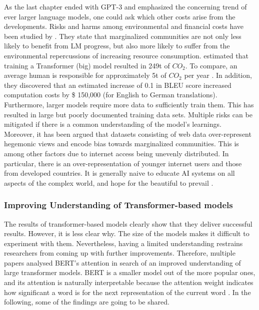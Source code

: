 \documentclass[
]{krantz}
\begin{document}
As the last chapter ended with GPT-3 and emphasized the concerning trend
of ever larger language models, one could ask which other costs arise
from the developments. Risks and harms among environmental and financial
costs have been studied by \citet{Bender2021}. They state that marginalized
communities are not only less likely to benefit from LM progress, but
also more likely to suffer from the environmental repercussions of
increasing resource consumption. \citet{Strubell2019} estimated that training
a Transformer (big) model resulted in 249t of \(CO_2\). To compare, an
average human is responsible for approximately 5t of \(CO_2\) per year
\citep{Ritchie2020}. In addition, they discovered that an
estimated increase of 0.1 in BLEU score increased computation costs by
\$ 150,000 (for English to German translations). Furthermore, larger
models require more data to sufficiently train them. This has resulted
in large but poorly documented training data sets. Multiple risks can be
mitigated if there is a common understanding of the model's learnings.\\

Moreover, it has been argued that datasets consisting of web data
over-represent hegemonic views and encode bias towards marginalized
communities. This is among other factors due to internet access being
unevenly distributed. In particular, there is an over-representation of
younger internet users and those from developed countries. It is
generally naive to educate AI systems on all aspects of the complex
world, and hope for the beautiful to prevail \citep{Bender2021}.

\hypertarget{improving-understanding-of-transformer-based-models}{%
\subsubsection{Improving Understanding of Transformer-based models}\label{improving-understanding-of-transformer-based-models}}

The results of transformer-based models clearly show that they deliver
successful results. However, it is less clear why. The size of the
models makes it difficult to experiment with them. Nevertheless, having
a limited understanding restrains researchers from coming up with
further improvements. Therefore, multiple papers analysed BERT's
attention in search of an improved understanding of large transformer
models. BERT is a smaller model out of the more popular ones, and its
attention is naturally interpretable because the attention weight
indicates how significant a word is for the next representation of the
current word \citep{Clark2019}. In the following, some of the findings are
going to be shared.\\
\end{document}
